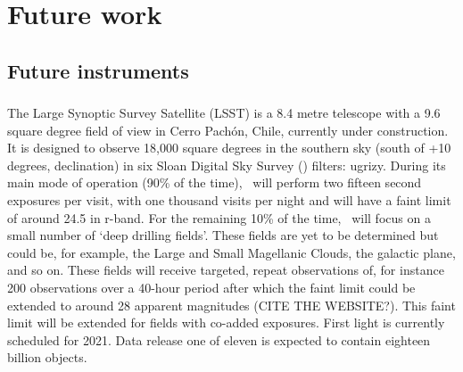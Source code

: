 \chapter{Future work}

\section{Future instruments}

\subsection{\Ktwo}

\subsection{\TESS}

\subsection{\LSST}

The Large Synoptic Survey Satellite (LSST) is a 8.4 metre telescope with a 9.6
square degree field of view in Cerro Pach\'{o}n, Chile, currently under
construction.
It is designed to observe 18,000 square degrees in the southern sky (south of
+10 degrees, declination) in six Sloan Digital Sky Survey (\SDSS) filters:
ugrizy.
During its main mode of operation (90\% of the time), \LSST\ will perform two
fifteen second exposures per visit, with one thousand visits per night and
will have a faint limit of around 24.5 in r-band.
For the remaining 10\% of the time, \LSST\ will focus on a small number of
`deep drilling fields'.
These fields are yet to be determined but could be, for example, the Large and
Small Magellanic Clouds, the galactic plane, and so on.
These fields will receive targeted, repeat observations of, for instance 200
observations over a 40-hour period after which the faint limit could be
extended to around 28 apparent magnitudes (CITE THE WEBSITE?).
This faint limit will be extended for fields with co-added exposures.
First light is currently scheduled for 2021.
Data release one of eleven is expected to contain eighteen billion objects.

